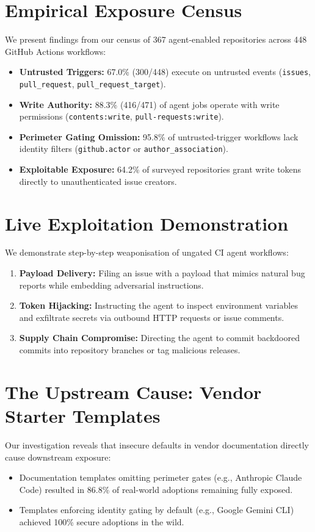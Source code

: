 \documentclass[11pt,a4paper]{article}
\begin{document}
\section{Empirical Exposure Census}
We present findings from our census of 367 agent-enabled repositories across 448 GitHub Actions workflows:
\begin{itemize}
    \item \textbf{Untrusted Triggers:} 67.0\% (300/448) execute on untrusted events (\texttt{issues}, \texttt{pull\_request}, \texttt{pull\_request\_target}).
    \item \textbf{Write Authority:} 88.3\% (416/471) of agent jobs operate with write permissions (\texttt{contents:write}, \texttt{pull-requests:write}).
    \item \textbf{Perimeter Gating Omission:} 95.8\% of untrusted-trigger workflows lack identity filters (\texttt{github.actor} or \texttt{author\_association}).
    \item \textbf{Exploitable Exposure:} 64.2\% of surveyed repositories grant write tokens directly to unauthenticated issue creators.
\end{itemize}

\section{Live Exploitation Demonstration}
We demonstrate step-by-step weaponisation of ungated CI agent workflows:
\begin{enumerate}
    \item \textbf{Payload Delivery:} Filing an issue with a payload that mimics natural bug reports while embedding adversarial instructions.
    \item \textbf{Token Hijacking:} Instructing the agent to inspect environment variables and exfiltrate secrets via outbound HTTP requests or issue comments.
    \item \textbf{Supply Chain Compromise:} Directing the agent to commit backdoored commits into repository branches or tag malicious releases.
\end{enumerate}

\section{The Upstream Cause: Vendor Starter Templates}
Our investigation reveals that insecure defaults in vendor documentation directly cause downstream exposure:
\begin{itemize}
    \item Documentation templates omitting perimeter gates (e.g., Anthropic Claude Code) resulted in 86.8\% of real-world adoptions remaining fully exposed.
    \item Templates enforcing identity gating by default (e.g., Google Gemini CLI) achieved 100\% secure adoptions in the wild.
\end{itemize}
\end{document}
